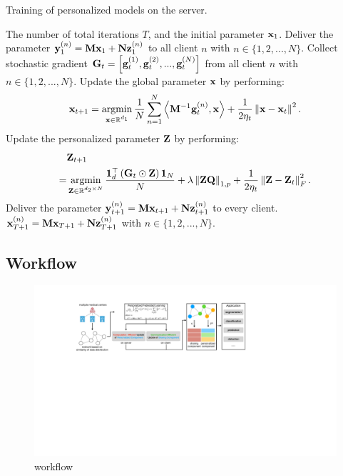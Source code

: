 \documentclass[journal]{IEEEtran}
\newcommand\algotext[1]{\end{algorithmic}#1\begin{algorithmic}[1]}
\begin{document}
\begin{algorithm}[!]
    \caption{Training of personalized models on the server.}
    \label{algo_xxx}
    \begin{algorithmic}[1]
        \Require The number of total iterations $T$, and the initial parameter ${\bf x}_1$.
        \State Deliver the parameter ${\bf y}_1^{(n)} = {\bf M}{\bf x}_1 + {\bf N}{\bf z}_1^{(n)}$ to all client $n$ with $n\in\{1,2, ..., N\}$.
            \State Collect stochastic gradient ${\bf G}_t = \left [ {\bf g}_t^{(1)}, {\bf g}_t^{(2)}, ..., {\bf g}_t^{(N)} \right ]$ from all client $n$ with $n\in\{1,2, ..., N\}$.
            \State Update the global parameter ${\bf x}$ by performing:
            $$ \x_{t+1} = \argmin_{\substack{\x\in\RR^{d_1}}} \frac{1}{N}\sum_{n=1}^N \lrangle{\M^{-1}\g_t^{(n)}, \x} + \frac{1}{2\eta_t}\lrnorm{\x - \x_t}^2.$$
            \State Update the personalized parameter ${\bf Z}$ by performing:
            \begin{align}
            \nonumber
            &\Z_{t+1} \\ \nonumber
            = & \argmin_{\substack{\Z\in\RR^{d_2\times N}}} \frac{\1_d^\top\lrincir{\G_t \odot \Z}\1_N}{N} + \lambda \lrnorm{\Z\Q}_{1,p} + \frac{1}{2\eta_t}\lrnorm{\Z - \Z_t}_F^2.
            \end{align}
            \State Deliver the parameter ${\bf y}_{t+1}^{(n)} = {\bf M}{\bf x}_{t+1} + {\bf N}{\bf z}_{t+1}^{(n)}$ to every client.
        \EndFor
        \Return ${\bf x}_{T+1}^{(n)} = {\bf M}{\bf x}_{T+1} + {\bf N}{\bf z}_{T+1}^{(n)}$ with $n\in\{1,2, ..., N\}$.
      \end{algorithmic}
\end{algorithm} 

\subsection{Workflow}


\begin{figure}[!t]
\setlength{\abovecaptionskip}{0pt}
\setlength{\belowcaptionskip}{0pt}
\centering 
\includegraphics[width=1.98\columnwidth]{figs/figs_workflow}
\caption{workflow}
\label{figure_xxx}
\end{figure}
\end{document}
